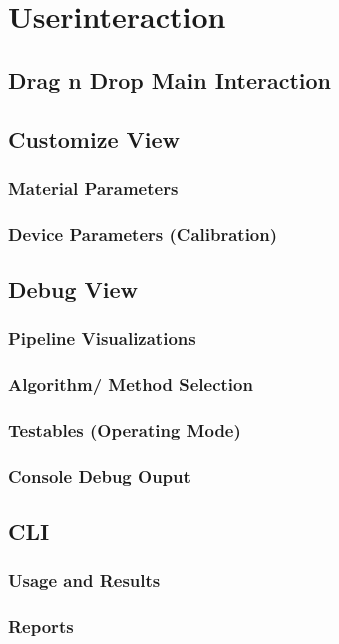 \documentclass[../ClassicThesis.tex]{subfiles}
\begin{document}
\chapter{Userinteraction}\label{ch:userinteraction}

\section{Drag n Drop Main Interaction}

\section{Customize View}

\subsection{Material Parameters}
\subsection{Device Parameters (Calibration)}

\section{Debug View}

\subsection{Pipeline Visualizations}
\subsection{Algorithm/ Method Selection}
\subsection{Testables (Operating Mode)}
\subsection{Console Debug Ouput}

\section{CLI}

\subsection{Usage and Results}
\subsection{Reports}
\end{document}
